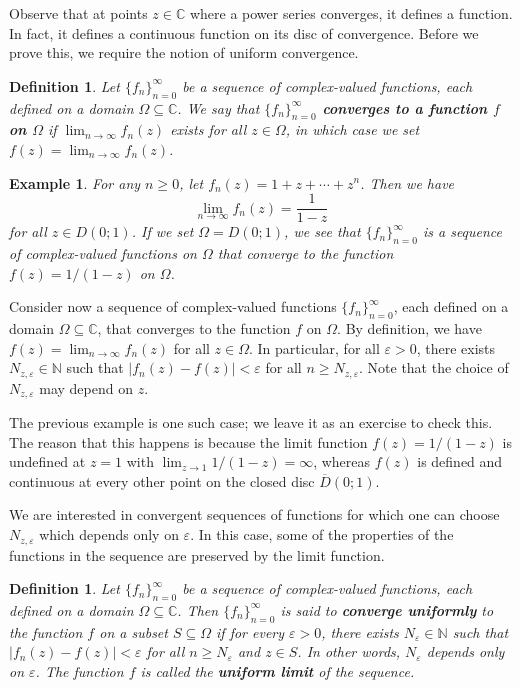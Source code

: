 \documentclass[10pt]{article}
\newcommand{\eps}{\varepsilon}
\newcommand{\C}{\mathbb{C}}
\newcommand{\N}{\mathbb{N}}
\theoremstyle{newstyle}
\newtheorem{defn}[thm]{Definition}
\newtheorem{exmp}[thm]{Example}
\begin{document}
Observe that at points $z \in \C$ where a power series converges, it defines a function. 
In fact, it defines a continuous function on its disc of convergence. Before we prove this, we require 
the notion of uniform convergence. 

\begin{defn}
Let $\{f_n\}_{n=0}^\infty$ be a sequence of complex-valued functions, each defined on a domain 
$\Omega \subseteq \C$. We say that {\bf $\{f_n\}_{n=0}^\infty$ converges to a function $f$ 
on $\Omega$} if $\lim_{n\to\infty} f_n(z)$ exists for all $z \in \Omega$, in which case we set 
$f(z) = \lim_{n\to\infty} f_n(z)$. 
\end{defn}

\begin{exmp}
For any $n \geq 0$, let $f_n(z) = 1+z+ \cdots + z^n$. Then we have 
\[ \lim_{n\to\infty} f_n(z) = \frac{1}{1-z} \]
for all $z \in D(0; 1)$. If we set $\Omega = D(0; 1)$, we see that $\{f_n\}_{n=0}^\infty$ 
is a sequence of complex-valued functions on $\Omega$ that converge to the function 
$f(z) = 1/(1-z)$ on $\Omega$. 
\end{exmp}

Consider now a sequence of complex-valued functions $\{f_n\}_{n=0}^\infty$, each defined on a 
domain $\Omega \subseteq \C$, that converges to the function $f$ on $\Omega$. By definition, 
we have $f(z) = \lim_{n\to\infty} f_n(z)$ for all $z \in \Omega$. In particular, for all 
$\eps > 0$, there exists $N_{z,\eps} \in \N$ such that $|f_n(z) - f(z)| < \eps$ for all 
$n \geq N_{z,\eps}$. Note that the choice of $N_{z,\eps}$ may depend on $z$. 

The previous example is one such case; we leave it as an exercise to check this. 
The reason that this happens is because the limit function $f(z) = 1/(1-z)$ is 
undefined at $z = 1$ with $\lim_{z\to1} 1/(1-z) = \infty$, whereas $f(z)$ is 
defined and continuous at every other point on the closed disc $\overline{D}(0; 1)$. 

We are interested in convergent sequences of functions for which one can choose 
$N_{z,\eps}$ which depends only on $\eps$. In this case, some of the properties of the functions 
in the sequence are preserved by the limit function. 

\begin{defn}
Let $\{f_n\}_{n=0}^\infty$ be a sequence of complex-valued functions, each defined on a domain 
$\Omega \subseteq \C$. Then $\{f_n\}_{n=0}^\infty$ is said to {\bf converge uniformly} 
to the function $f$ on a subset $S \subseteq \Omega$ if for every $\eps > 0$, there 
exists $N_\eps \in \N$ such that $|f_n(z) - f(z)| < \eps$ for all $n \geq N_\eps$ and $z \in S$. 
In other words, $N_\eps$ depends only on $\eps$. The function $f$ is called the {\bf uniform limit} 
of the sequence.
\end{defn}
\end{document}
